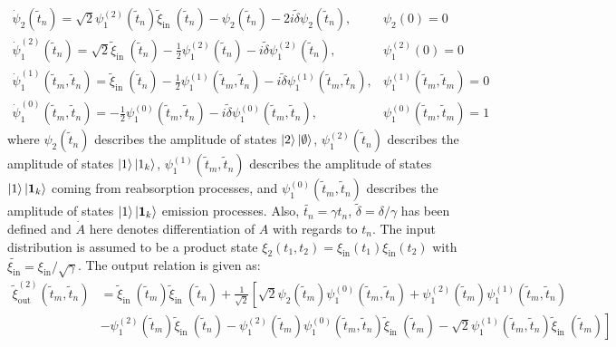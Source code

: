 \begin{equation}
\begin{array}{lr}
\dot{\psi}_2\left(\tilde{t}_n\right)=\sqrt{2} \psi_1^{(2)}\left(\tilde{t}_n\right) \tilde{\xi}_{\text {in }}\left(\tilde{t}_n\right)-\psi_2\left(\tilde{t}_n\right)-2 i \tilde{\delta} \psi_2\left(\tilde{t}_n\right), & \psi_2(0)=0 \\
\dot{\psi}_1^{(2)}\left(\tilde{t}_n\right)=\sqrt{2} \tilde{\xi}_{\text {in }}\left(\tilde{t}_n\right)-\frac{1}{2} \psi_1^{(2)}\left(\tilde{t}_n\right)-i \tilde{\delta} \psi_1^{(2)}\left(\tilde{t}_n\right), & \psi_1^{(2)}(0)=0 \\
\dot{\psi}_1^{(1)}\left(\tilde{t}_m, \tilde{t}_n\right)=\tilde{\xi}_{\text {in }}\left(\tilde{t}_n\right)-\frac{1}{2} \psi_1^{(1)}\left(\tilde{t}_m, \tilde{t}_n\right)-i \tilde{\delta} \psi_1^{(1)}\left(\tilde{t}_m, \tilde{t}_n\right), & \psi_1^{(1)}\left(\tilde{t}_m, \tilde{t}_m\right)=0 \\
\dot{\psi}_1^{(0)}\left(\tilde{t}_m, \tilde{t}_n\right)=-\frac{1}{2} \psi_1^{(0)}\left(\tilde{t}_m, \tilde{t}_n\right)-i \tilde{\delta} \psi_1^{(0)}\left(\tilde{t}_m, \tilde{t}_n\right), & \psi_1^{(0)}\left(\tilde{t}_m, \tilde{t}_m\right)=1
\end{array} \label{eq:twophotonEOM}
\end{equation}
where $\psi_2\left(\tilde{t}_n\right)$ describes the amplitude of states $\ket{2}\ket{\emptyset}$, $\psi_1^{(2)}\left(\tilde{t}_n\right)$ describes the amplitude of states $\ket{1}\ket{1_k}$, $\psi_1^{(1)}\left(\tilde{t}_m, \tilde{t}_n\right)$ describes the amplitude of states $\ket{1}\ket{\mathbf{1}_k}$ coming from reabsorption processes, and $\psi_1^{(0)}\left(\tilde{t}_m, \tilde{t}_n\right)$ describes the amplitude of states $\ket{1}\ket{\mathbf{1}_k}$ emission processes. Also, $\tilde{t_n} = \gamma t_n$, $\tilde{\delta} = \delta/\gamma$ has been defined and $\dot{A}$ here denotes differentiation of $A$ with regards to $t_n$. The input distribution is assumed to be a product state $\xi_2(t_1,t_2) = \xi_\mathrm{in}(t_1)\xi_\mathrm{in}(t_2)$ with $\tilde{\xi_\mathrm{in}} = \xi_\mathrm{in}/\sqrt{\gamma}$. The output relation is given as:
\begin{equation}
\begin{aligned}
\tilde{\xi}_{\text {out }}^{(2)}\left(\tilde{t}_m, \tilde{t}_n\right) & =\tilde{\xi}_{\text {in }}\left(\tilde{t}_m\right) \tilde{\xi}_{\text {in }}\left(\tilde{t}_n\right)+\frac{1}{\sqrt{2}}\left[\sqrt{2} \psi_2\left(\tilde{t}_m\right) \psi_1^{(0)}\left(\tilde{t}_m, \tilde{t}_n\right)+\psi_1^{(2)}\left(\tilde{t}_m\right) \psi_1^{(1)}\left(\tilde{t}_m, \tilde{t}_n\right)\right. \\
& \left.-\psi_1^{(2)}\left(\tilde{t}_m\right) \tilde{\xi}_{\text {in }}\left(\tilde{t}_n\right)-\psi_1^{(2)}\left(\tilde{t}_m\right) \psi_1^{(0)}\left(\tilde{t}_m, \tilde{t}_n\right) \tilde{\xi}_{\text {in }}\left(\tilde{t}_m\right)-\sqrt{2} \psi_1^{(1)}\left(\tilde{t}_m, \tilde{t}_n\right) \tilde{\xi}_{\text {in }}\left(\tilde{t}_m\right)\right]
\end{aligned}
\end{equation}
